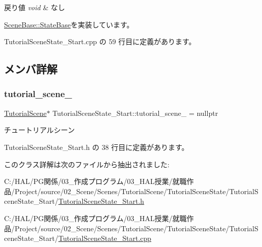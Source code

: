 \begin{DoxyRetVals}{戻り値}
{\em void} & なし \\
\hline
\end{DoxyRetVals}


\mbox{\hyperlink{class_scene_base_1_1_state_base_ad2c6c8fd9f020eb02f64f394edee129c}{Scene\+Base\+::\+State\+Base}}を実装しています。



 Tutorial\+Scene\+State\+\_\+\+Start.\+cpp の 59 行目に定義があります。



\subsection{メンバ詳解}
\mbox{\label{class_tutorial_scene_state___start_a1fea5f4f4713a1461a86cbc9fc263e41}} 
\subsubsection{\texorpdfstring{tutorial\+\_\+scene\+\_\+}{tutorial\_scene\_}}
{\footnotesize\ttfamily \mbox{\hyperlink{class_tutorial_scene}{Tutorial\+Scene}}$\ast$ Tutorial\+Scene\+State\+\_\+\+Start\+::tutorial\+\_\+scene\+\_\+ = nullptr\hspace{0.3cm}{\ttfamily [private]}}



チュートリアルシーン 



 Tutorial\+Scene\+State\+\_\+\+Start.\+h の 38 行目に定義があります。



このクラス詳解は次のファイルから抽出されました\+:\begin{DoxyCompactItemize}
\item 
C\+:/\+H\+A\+L/\+P\+G関係/03\+\_\+作成プログラム/03\+\_\+\+H\+A\+L授業/就職作品/\+Project/source/02\+\_\+\+Scene/\+Scenes/\+Tutorial\+Scene/\+Tutorial\+Scene\+State/\+Tutorial\+Scene\+State\+\_\+\+Start/\mbox{\hyperlink{_tutorial_scene_state___start_8h}{Tutorial\+Scene\+State\+\_\+\+Start.\+h}}\item 
C\+:/\+H\+A\+L/\+P\+G関係/03\+\_\+作成プログラム/03\+\_\+\+H\+A\+L授業/就職作品/\+Project/source/02\+\_\+\+Scene/\+Scenes/\+Tutorial\+Scene/\+Tutorial\+Scene\+State/\+Tutorial\+Scene\+State\+\_\+\+Start/\mbox{\hyperlink{_tutorial_scene_state___start_8cpp}{Tutorial\+Scene\+State\+\_\+\+Start.\+cpp}}\end{DoxyCompactItemize}
